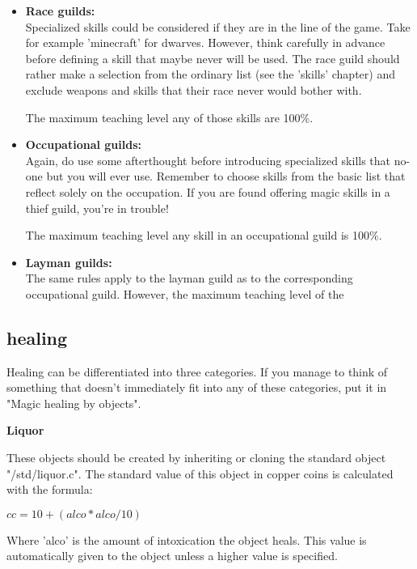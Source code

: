 \begin{itemize}
\item{\bf Race guilds: } \\
    Specialized skills could be considered if they are in the line of 
    the game. Take for example 'minecraft' for dwarves. However, think
    carefully in advance before defining a skill that maybe never will
    be used. The race guild should rather make a selection from the
    ordinary list (see the 'skills' chapter) and exclude weapons and 
    skills that their race never would bother with.

    The maximum teaching level any of those skills are 100\%.

\item{\bf Occupational guilds:} \\
    Again, do use some afterthought before introducing specialized skills
    that no-one but you will ever use. Remember to choose skills from
    the basic list that reflect solely on the occupation. If you are
    found offering magic skills in a thief guild, you're in trouble!

    The maximum teaching level any skill in an occupational guild
    is 100\%.   

\item{\bf Layman guilds:} \\
    The same rules apply to the layman guild as to the corresponding
    occupational guild. However, the maximum teaching level of the
\end{itemize}

\subsection{healing}

Healing can be differentiated into three categories. If you manage 
to think of something that doesn't immediately fit into any of these
categories, put it in "Magic healing by objects".

{\bf Liquor}


These objects should be created by inheriting or cloning the standard
object "/std/liquor.c". The standard value of this object in copper 
coins is calculated with the formula: 

    $cc = 10 + (alco * alco / 10)$
    
Where 'alco' is the amount of intoxication the object heals. This value
is automatically given to the object unless a higher value is specified.

